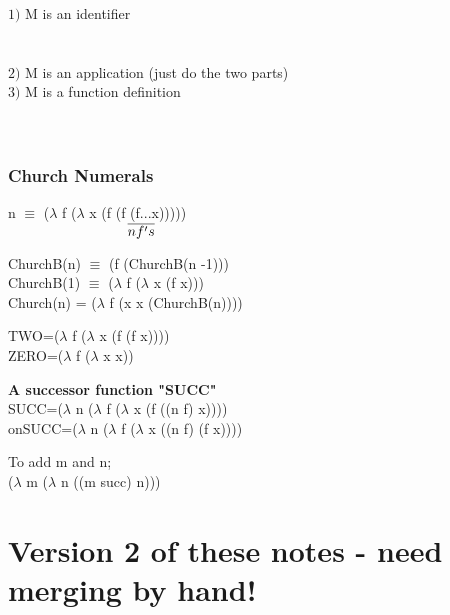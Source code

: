 \documentclass{article}
\newcommand\tab[1][1cm]{\hspace*{#1}}
\begin{document}
\begin{flushleft}
$1)$ M is an identifier\\
\tab{a) M=x $\Rightarrow$ M[x	:=N] is N}\\
\tab{b) M$\neq$x $\Rightarrow$ M[x:=N] is M}\\
\bigskip
$2)$ M is an application (just do the two parts)\\
\bigskip
$3)$ M is a function definition\\
\tab{Case (a) is easy $\lambda$yM1, y=x}\\
\tab{Case (b) is hard $\lambda$yM1, y$\neq$x}\\
\end{flushleft}

\subsubsection*{Church Numerals}
\begin{flushleft}
n $\equiv$ ($\lambda$ f ($\lambda$ x (f (f (f...x)))))\\
$\tab{\tab{\tab{\overline{n f's}}}}$
\end{flushleft}

\begin{flushleft}
ChurchB(n) $\equiv$ (f (ChurchB(n -1)))\\
ChurchB(1) $\equiv$ ($\lambda$ f ($\lambda$ x (f x)))\\
\bigskip
Church(n) = ($\lambda$ f (x x (ChurchB(n))))\\
\end{flushleft}

\begin{flushleft}
TWO=($\lambda$ f ($\lambda$ x (f (f x))))\\
ZERO=($\lambda$ f ($\lambda$ x x))\\
\end{flushleft}
\bigskip
\begin{flushleft}
\textbf{A successor function "SUCC"}\\
SUCC=($\lambda$ n ($\lambda$ f ($\lambda$ x (f ((n f) x))))\\
onSUCC=($\lambda$ n ($\lambda$ f ($\lambda$ x ((n f) (f x))))
\end{flushleft}

\begin{flushleft}
To add m and n;\\
($\lambda$ m ($\lambda$ n ((m succ) n)))
\end{flushleft}


\section{Version 2 of these notes - need merging by hand!}
\end{document}
